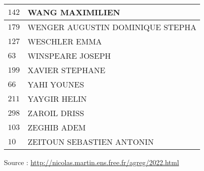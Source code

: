 \begin{xltabular}{\linewidth}{|l|X|}
    \hline
    $142$ & WANG MAXIMILIEN \\
    \hline
    $179$ & WENGER AUGUSTIN DOMINIQUE STEPHA \\
    \hline
    $127$ & WESCHLER EMMA \\
    \hline
    $63$ & WINSPEARE JOSEPH \\
    \hline
    $199$ & XAVIER STEPHANE \\
    \hline
    $66$ & YAHI YOUNES \\
    \hline
    $211$ & YAYGIR HELIN \\
    \hline
    $298$ & ZAROIL DRISS \\
    \hline
    $103$ & ZEGHIB ADEM \\
    \hline
    $10$ & ZEITOUN SEBASTIEN ANTONIN \\
    \hline
  \end{xltabular}

  \begin{flushright}
    {\tiny Source : \url{http://nicolas.martin.ens.free.fr/agreg/2022.html}}
  \end{flushright}


